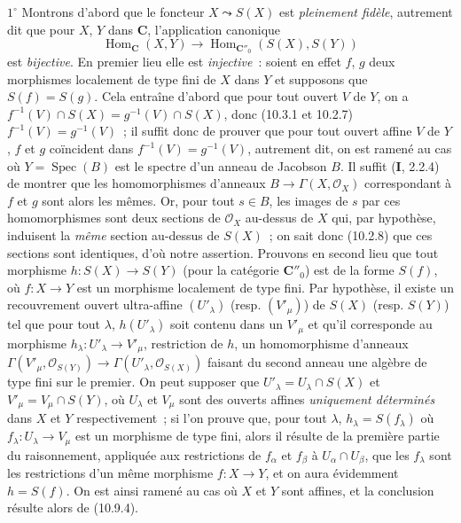 $1^\circ$ Montrons d'abord que le foncteur $X\leadsto S(X)$ est
\emph{pleinement fidèle}, autrement dit que pour $X$, $Y$ dans $\boldsymbol{C}$,
l'application canonique
\[
  \operatorname{Hom}_{\mathbf C}(X,Y)\longrightarrow
  \operatorname{Hom}_{\mathbf C''_0}(S(X),S(Y))
\]
est \emph{bijective}. En premier lieu elle est \emph{injective}~: soient en
effet $f$, $g$ deux morphismes localement de type fini de $X$ dans $Y$ et
supposons que $S(f)=S(g)$. Cela entraîne d'abord que pour tout ouvert $V$ de
$Y$, on a
$f^{-1}(V)\cap S(X)=g^{-1}(V)\cap S(X)$, donc (10.3.1 et 10.2.7)
$f^{-1}(V)=g^{-1}(V)$~; il suffit donc de prouver que pour tout ouvert affine
$V$ de $Y$, $f$ et $g$ coïncident dans
$f^{-1}(V)=g^{-1}(V)$, autrement dit, on est ramené au cas où
$Y=\operatorname{Spec}(B)$ est le spectre d'un anneau de Jacobson $B$. Il
suffit (\textbf I, 2.2.4) de montrer que les homomorphismes d'anneaux
$B\to\Gamma(X,\mathcal O_X)$ correspondant à $f$ et $g$ sont alors les mêmes.
Or, pour tout $s\in B$, les images de $s$ par ces homomorphismes sont deux
sections de $\mathcal O_X$ au-dessus de $X$ qui, par hypothèse, induisent la
\emph{même} section au-dessus de $S(X)$~; on sait donc (10.2.8) que ces sections sont
identiques, d'où notre assertion. Prouvons en second lieu que tout morphisme
$h:S(X)\to S(Y)$ (pour la catégorie $\boldsymbol{C}''_0$) est de la forme $S(f)$,
où $f:X\to Y$ est un morphisme localement de type fini. Par hypothèse, il
existe un recouvrement ouvert ultra-affine $(U'_\lambda)$ (resp.
$(V'_\mu)$) de $S(X)$ (resp. $S(Y)$) tel que pour tout $\lambda$,
$h(U'_\lambda)$ soit contenu dans un $V'_\mu$ et qu'il corresponde au
morphisme $h_\lambda:U'_\lambda\to V'_\mu$, restriction de $h$, un
homomorphisme d'anneaux
$\Gamma(V'_\mu,\mathcal O_{S(Y)})\to
\Gamma(U'_\lambda,\mathcal O_{S(X)})$ faisant du second anneau une algèbre de
type fini sur le premier. On peut supposer que
$U'_\lambda=U_\lambda\cap S(X)$ et $V'_\mu=V_\mu\cap S(Y)$, où
$U_\lambda$ et $V_\mu$ sont des ouverts affines \emph{uniquement déterminés} dans
$X$ et $Y$ respectivement~; si l'on prouve que, pour tout $\lambda$,
$h_\lambda=S(f_\lambda)$ où $f_\lambda:U_\lambda\to V_\mu$ est un morphisme
de type fini, alors il résulte de la première partie du raisonnement,
appliquée aux restrictions de $f_\alpha$ et $f_\beta$ à
$U_\alpha\cap U_\beta$, que les $f_\lambda$ sont les restrictions d'un même
morphisme $f:X\to Y$, et on aura évidemment $h=S(f)$. On est ainsi ramené au
cas où $X$ et $Y$ sont affines, et la conclusion résulte alors de (10.9.4).

